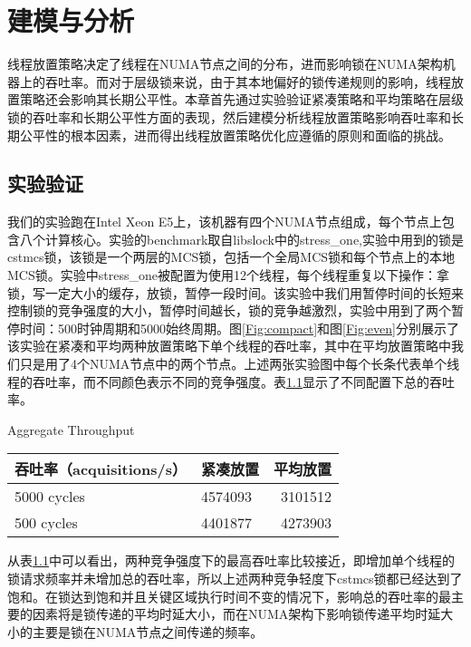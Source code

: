 
\chapter{建模与分析}
\label{chap:example}
线程放置策略决定了线程在NUMA节点之间的分布，进而影响锁在NUMA架构机器上的吞吐率。而对于层级锁来说，由于其本地偏好的锁传递规则的影响，线程放置策略还会影响其长期公平性。本章首先通过实验验证紧凑策略和平均策略在层级锁的吞吐率和长期公平性方面的表现，然后建模分析线程放置策略影响吞吐率和长期公平性的根本因素，进而得出线程放置策略优化应遵循的原则和面临的挑战。
\section{实验验证}
我们的实验跑在Intel Xeon E5上，该机器有四个NUMA节点组成，每个节点上包含八个计算核心。实验的benchmark取自libslock中的stress\_one,实验中用到的锁是cstmcs锁，该锁是一个两层的MCS锁，包括一个全局MCS锁和每个节点上的本地MCS锁。实验中stress\_one被配置为使用12个线程，每个线程重复以下操作：拿锁，写一定大小的缓存，放锁，暂停一段时间。该实验中我们用暂停时间的长短来控制锁的竞争强度的大小，暂停时间越长，锁的竞争越激烈，实验中用到了两个暂停时间：500时钟周期和5000始终周期。图\ref{Fig:compact}和图\ref{Fig:even}分别展示了该实验在紧凑和平均两种放置策略下单个线程的吞吐率，其中在平均放置策略中我们只是用了4个NUMA节点中的两个节点。上述两张实验图中每个长条代表单个线程的吞吐率，而不同颜色表示不同的竞争强度。表\ref{tab:aggregate}显示了不同配置下总的吞吐率。

\begin{table}[!hpb]
  \centering
    {Aggregate Throughput}
  \label{tab:aggregate}
  \begin{tabular}{@{}llr@{}} \toprule
    吞吐率（acquisitions/s） & 紧凑放置 & 平均放置 \\ \midrule
    5000 cycles & 4574093 & 3101512 \\
    500  cycles & 4401877 & 4273903 \\
  \end{tabular}
\end{table}

从表\ref{tab:aggregate}中可以看出，两种竞争强度下的最高吞吐率比较接近，即增加单个线程的锁请求频率并未增加总的吞吐率，所以上述两种竞争轻度下cstmcs锁都已经达到了饱和。在锁达到饱和并且关键区域执行时间不变的情况下，影响总的吞吐率的最主要的因素将是锁传递的平均时延大小，而在NUMA架构下影响锁传递平均时延大小的主要是锁在NUMA节点之间传递的频率。

